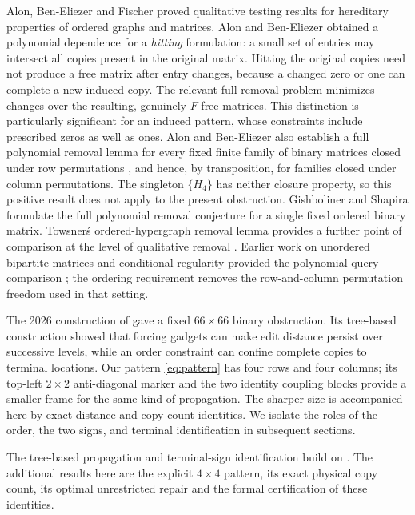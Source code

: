 Alon, Ben-Eliezer and Fischer \cite{ABF} proved qualitative testing
results for hereditary properties of ordered graphs and matrices.
Alon and Ben-Eliezer \cite{ABE20} obtained a polynomial dependence for
a \emph{hitting} formulation: a small set of entries may intersect all
copies present in the original matrix. Hitting the original copies
need not produce a free matrix after entry changes, because a changed
zero or one can complete a new induced copy.  The relevant full removal
problem minimizes changes over the resulting, genuinely $F$-free
matrices.  This distinction is particularly significant for an induced
pattern, whose constraints include prescribed zeros as well as ones.
Alon and Ben-Eliezer also establish a full polynomial removal lemma
for every fixed finite family of binary matrices closed under row
permutations \cite[Theorem~1.5]{ABE20}, and hence, by transposition,
for families closed under column permutations. The singleton
$\{H_4\}$ has neither closure property, so this positive result does
not apply to the present obstruction. Gishboliner and Shapira
\cite[Conjecture~4.5]{GS25} formulate the full polynomial removal
conjecture for a single fixed ordered binary matrix.
Towsner\'s ordered-hypergraph removal lemma provides a further
point of comparison at the level of qualitative removal \cite{Towsner}.
Earlier work on unordered bipartite matrices and conditional regularity
provided the polynomial-query comparison \cite{AFN07}; the ordering
requirement removes the row-and-column permutation freedom used in that
setting.

The 2026 construction of \cite{OAI} gave a fixed $66\times66$ binary
obstruction. Its tree-based construction showed that forcing gadgets can
make edit distance persist over successive levels, while an order
constraint can confine complete copies to terminal locations.  Our
pattern \eqref{eq:pattern} has four rows and four columns; its top-left
$2\times2$ anti-diagonal marker and the two identity coupling blocks
provide a smaller frame for the same kind of propagation.  The
sharper size is accompanied here by exact distance and copy-count
identities.  We isolate the roles of the order, the two signs, and
terminal identification in subsequent sections.

The tree-based propagation and terminal-sign identification build on
\cite{OAI}. The additional results here are the explicit $4\times4$
pattern, its exact physical copy count, its optimal unrestricted
repair and the formal certification of these identities.

